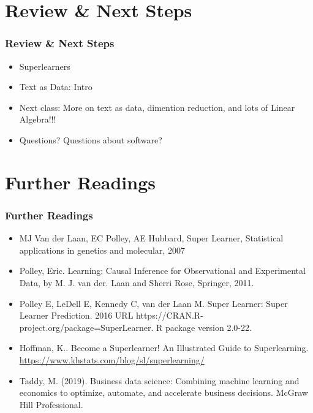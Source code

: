 \documentclass[
  shownotes,
  xcolor={svgnames},
  hyperref={colorlinks,citecolor=DarkBlue,linkcolor=DarkRed,urlcolor=DarkBlue}
  , aspectratio=169]{beamer}
\begin{document}
\section{Review  \& Next Steps}
\begin{frame}
\frametitle{Review \& Next Steps}
  
\begin{itemize} 

\item Superlearners
\medskip  
\item Text as Data: Intro

    \bigskip  
  \item  Next class:  More on text as data, dimention reduction, and lots of Linear Algebra!!!


\bigskip  
\item Questions? Questions about software? 

\end{itemize}
\end{frame}


\section{Further Readings}
\begin{frame}
\frametitle{Further Readings}

\begin{itemize}

  \item MJ Van der Laan, EC Polley, AE Hubbard, Super Learner, Statistical applications in genetics and molecular, 2007

  \medskip
  \item Polley, Eric. Learning: Causal Inference for Observational and Experimental Data, by M. J. van der. Laan and Sherri Rose, Springer, 2011.
  \medskip
  \item Polley E, LeDell E, Kennedy C, van der Laan M. Super Learner: Super Learner Prediction. 2016 URL https://CRAN.R-project.org/package=SuperLearner. R package version 2.0-22.
  \medskip
  \item Hoffman, K.. Become a Superlearner! An Illustrated Guide to Superlearning. \url{https://www.khstats.com/blog/sl/superlearning/}
  \medskip
  \item Taddy, M. (2019). Business data science: Combining machine learning and economics to optimize, automate, and accelerate business decisions. McGraw Hill Professional.

  
\end{itemize}

\end{frame}
\end{document}
